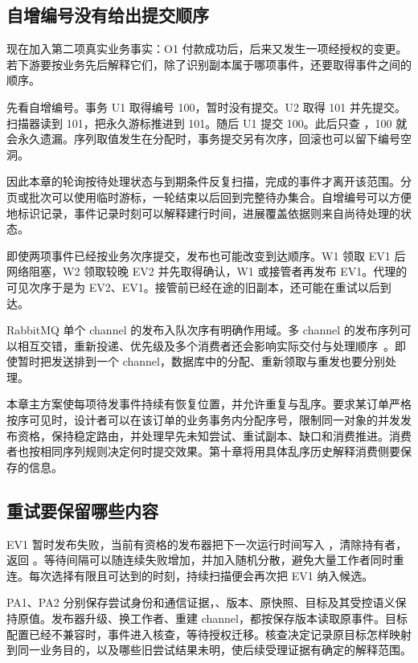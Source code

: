 \subsection*{自增编号没有给出提交顺序}

现在加入第二项真实业务事实：O1 付款成功后，后来又发生一项经授权的变更。若下游要按业务先后解释它们，除了识别副本属于哪项事件，还要取得事件之间的顺序。

先看自增编号。事务 U1 取得编号 100，暂时没有提交。U2 取得 101 并先提交。扫描器读到 101，把永久游标推进到 101。随后 U1 提交 100。此后只查 ，100 就会永久遗漏。序列取值发生在分配时，事务提交另有次序，回滚也可以留下编号空洞。

因此本章的轮询按待处理状态与到期条件反复扫描，完成的事件才离开该范围。分页或批次可以使用临时游标，一轮结束以后回到完整待办集合。自增编号可以方便地标识记录，事件记录时刻可以解释建行时间，进展覆盖依据则来自尚待处理的状态。


即使两项事件已经按业务次序提交，发布也可能改变到达顺序。W1 领取 EV1 后网络阻塞，W2 领取较晚 EV2 并先取得确认，W1 或接管者再发布 EV1。代理的可见次序于是为 EV2、EV1。接管前已经在途的旧副本，还可能在重试以后到达。

RabbitMQ 单个 channel 的发布入队次序有明确作用域。多 channel 的发布序列可以相互交错，重新投递、优先级及多个消费者还会影响实际交付与处理顺序~\cite{rabbitmq-queues}。即使暂时把发送排到一个 channel，数据库中的分配、重新领取与重发也要分别处理。

本章主方案使每项待发事件持续有恢复位置，并允许重复与乱序。要求某订单严格按序可见时，设计者可以在该订单的业务事务内分配序号，限制同一对象的并发发布资格，保持稳定路由，并处理早先未知尝试、重试副本、缺口和消费推进。消费者也按相同序列规则决定何时提交效果。第十章将用具体乱序历史解释消费侧要保存的信息。

\subsection*{重试要保留哪些内容}

EV1 暂时发布失败，当前有资格的发布器把下一次运行时间写入 ，清除持有者，返回 。等待间隔可以随连续失败增加，并加入随机分散，避免大量工作者同时重连。每次选择有限且可达到的时刻，持续扫描便会再次把 EV1 纳入候选。

PA1、PA2 分别保存尝试身份和通信证据，、版本、原快照、目标及其受控语义保持原值。发布器升级、换工作者、重建 channel，都按保存版本读取原事件。目标配置已经不兼容时，事件进入核查，等待授权迁移。核查决定记录原目标怎样映射到同一业务目的，以及哪些旧尝试结果未明，使后续受理证据有确定的解释范围。

